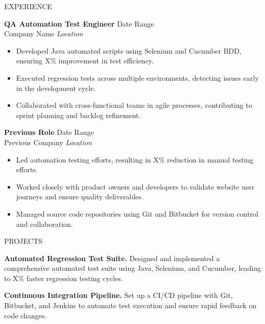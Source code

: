 \documentclass{resume} %
\begin{document}
\begin{rSection}{EXPERIENCE}

\textbf{QA Automation Test Engineer} \hfill Date Range\\
Company Name \hfill \textit{Location}
 \begin{itemize}
    \itemsep -3pt {} 
     \item Developed Java automated scripts using Selenium and Cucumber BDD, ensuring X\% improvement in test efficiency.
     \item Executed regression tests across multiple environments, detecting issues early in the development cycle.
     \item Collaborated with cross-functional teams in agile processes, contributing to sprint planning and backlog refinement.
 \end{itemize}
 
\textbf{Previous Role} \hfill Date Range\\
Previous Company \hfill \textit{Location}
 \begin{itemize}
    \itemsep -3pt {} 
     \item Led automation testing efforts, resulting in X\% reduction in manual testing efforts.
     \item Worked closely with product owners and developers to validate website user journeys and ensure quality deliverables.
    \item Managed source code repositories using Git and Bitbucket for version control and collaboration.
 \end{itemize}

\end{rSection} 


\begin{rSection}{PROJECTS}
\vspace{-1.25em}
\item \textbf{Automated Regression Test Suite.} {Designed and implemented a comprehensive automated test suite using Java, Selenium, and Cucumber, leading to X\% faster regression testing cycles.}
\item \textbf{Continuous Integration Pipeline.} {Set up a CI/CD pipeline with Git, Bitbucket, and Jenkins to automate test execution and ensure rapid feedback on code changes.}
\end{rSection} 
\end{document}
